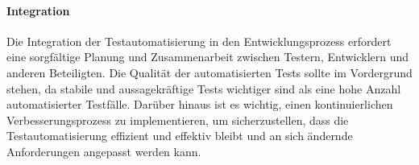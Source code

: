 \paragraph{Integration}

Die Integration der Testautomatisierung in den Entwicklungsprozess erfordert eine sorgfältige Planung und Zusammenarbeit zwischen Testern, Entwicklern und anderen Beteiligten. Die 
Qualität der automatisierten Tests sollte im Vordergrund stehen, da stabile und aussagekräftige Tests wichtiger sind als eine hohe Anzahl automatisierter Testfälle. Darüber hinaus 
ist es wichtig, einen kontinuierlichen Verbesserungsprozess zu implementieren, um sicherzustellen, dass die Testautomatisierung effizient und effektiv bleibt und an sich ändernde 
Anforderungen angepasst werden kann. 

\citep{Baumgartner2021} \citep{Witte2023}